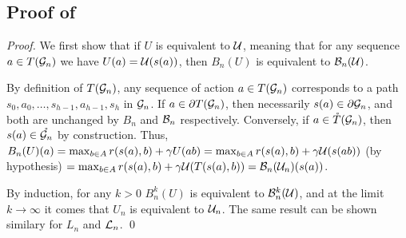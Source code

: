 \documentclass[runningheads]{llncs}
\begin{document}
%
%

\subsection{Proof of }
\begin{proof}
	
We first show that if $U$ is equivalent to $\mathcal{U}$, meaning that for any sequence $a\in T(\mathcal{G}_n)$ we have $U(a) = \mathcal{U}(s(a))$, then $B_n(U)$ is equivalent to $\mathcal{B}_n(\mathcal{U})$.

By definition of $T(\mathcal{G}_n)$, any sequence of action $a\in T(\mathcal{G}_n)$ corresponds to a path $s_0, a_0,\dots, s_{h-1}, a_{h-1}, s_{h}$ in $\mathcal{G}_n$. If $a\in{\partial T(\mathcal{G}_n)}$, then necessarily $s(a)\in{\partial \mathcal{G}_n}$, and both are unchanged by $B_n$ and $\mathcal{B}_n$ respectively. Conversely, if $a\in\mathring{T}(\mathcal{G}_n)$, then $s(a)\in\mathring{\mathcal{G}_n}$ by construction. Thus, $B_n(U)(a) = \max_{b\in A} r(s(a), b) + \gamma U({ab}) = \max_{b\in A} r(s(a), b) + \gamma \mathcal{U}(s({ab}))$ (by hypothesis) $= \max_{b\in A} r(s(a), b) + \gamma \mathcal{U}(T(s({a}),b)) = \mathcal{B}_n(\mathcal{U}_n)(s(a))$.

By induction, for any $k>0$ $B_n^k(U)$ is equivalent to $\mathcal{B}_n^k(\mathcal{U})$, and at the limit $k\rightarrow\infty$ it comes that $U_n$ is equivalent to $\mathcal{U}_n$. The same result can be shown similary for $L_n$ and $\mathcal{L}_n$.
\qed\end{proof}
\end{document}

